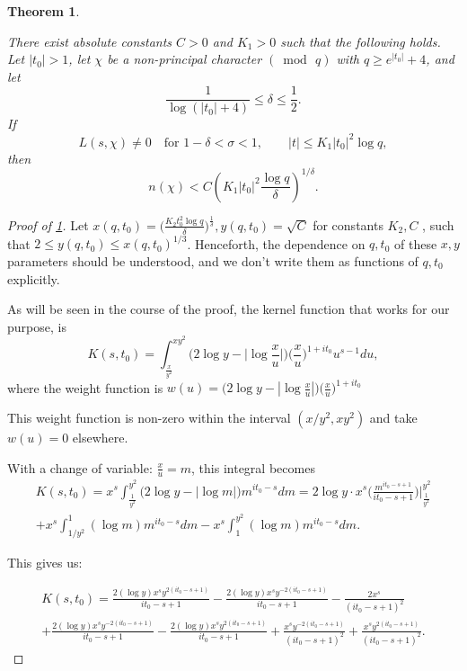 \documentclass[10pt,a4paper]{amsart}
\newtheorem{theorem}{Theorem}
\begin{document}
\begin{theorem}\label{mainthm}

There exist absolute constants $C>0$ and $K_1>0$ such that the following holds.
Let $|t_0|>1$, let $\chi$ be a non-principal character $(\bmod\, q)$ with
$q \ge e^{|t_0|}+4$, and let
\[
\frac{1}{\log(|t_0|+4)} \le \delta \le \frac{1}{2}.
\]
If
\[
L(s,\chi)\neq 0 \quad \text{for } 1-\delta<\sigma<1, \qquad
|t| \le K_1 |t_0|^2 \log q,
\]
then
\[
n(\chi) < C\left( K_1 |t_0|^2 \frac{\log q}{\delta} \right)^{1/\delta}.
\]
\end{theorem}

\begin{proof}[Proof of \cref{mainthm}]
 Let $x(q,t_0)=\Big(\frac{K_2 t_{0}^{2}\log q}{\delta}\Big)^{\frac{1}{\delta}},y(q,t_0)=\sqrt{C}$  for constants $K_2,C$ , such that $2\leq y(q,t_0)\leq x(q,t_0)^{1/3}$. Henceforth, the dependence on $q, t_0$ of these $x,y$ parameters should be understood, and we don't write them as functions of $q,t_0$ explicitly.

 \bigskip
 
As will be seen in the course of the proof, the kernel function that works for our purpose, is
\begin{equation}
    K(s,t_0)=\int_{\frac{x}{y^{2}}}^{xy^{2}} \Big(2 \log y -\Big|\log \frac{x}{u}\Big|\Big)\Big(\frac{x}{u}\Big)^{1+it_0}u^{s-1} du,
\end{equation}
where the weight function is $w(u)=\big(2 \log y -|\log \frac{x}{u}|\big)\big(\frac{x}{u}\big)^{1+it_0}$


This weight function is  non-zero within the interval $(x/y^{2}, xy^{2})$ and take $w(u)=0$ elsewhere.

With a change of variable: $\frac{x}{u}=m$, this integral becomes 
\begin{multline}
    K(s,t_0)=x^{s}\int_{\frac{1}{y^{2}}}^{y^{2}} \Big( 2\log y -|\log m|  \Big) m^{it_0 -s} dm=2\log y\cdot x^{s} \Big( \frac{m^{it_0 -s+1}}{it_0 -s+1} \Big)|_{\frac{1}{y^{2}}}^{y^{2}}\\
    +x^{s}\int_{1/y^{2}}^{1} (\log m) m^{it_0 -s}dm -x^{s}\int_{1}^{y^{2}}(\log m) m^{it_0 -s} dm.
\end{multline}

\noindent This gives us:

\begin{multline}
    K(s,t_0)=\frac{2(\log y) x^{s} y^{2(it_0 -s +1)} }{it_0 -s+1}-\frac{2(\log y) x^{s} y^{-2(it_0 -s +1)} }{it_0 -s+1} -\frac{2x^{s}}{(it_0 -s+1)^{2}}\\ +\frac{2(\log y) x^{s} y^{-2(it_0 -s +1)} }{it_0 -s+1}-\frac{2(\log y) x^{s} y^{2(it_0 -s +1)} }{it_0 -s+1}+\frac{x^{s}y^{-2(it_0 -s+1)}}{(it_0-s+1)^{2}}+\frac{x^{s}y^{2(it_0 -s+1)}}{(it_0-s+1)^{2}}.
\end{multline}


\end{proof}
\end{document}

